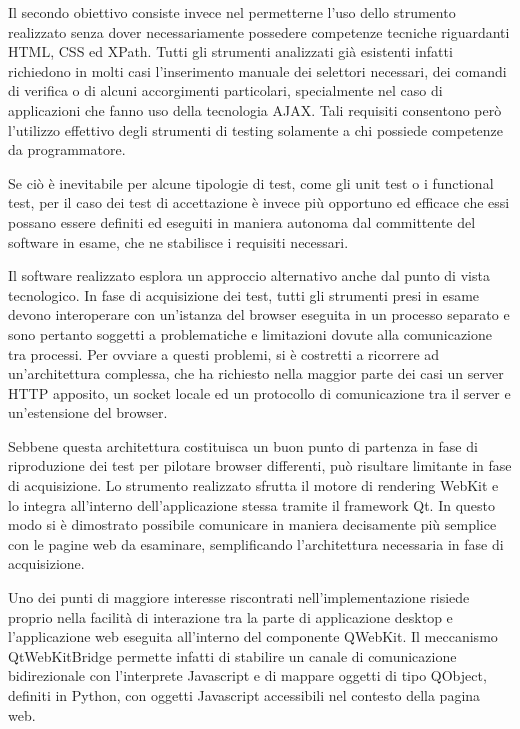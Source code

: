 \documentclass[12pt]{toptesi}
\begin{document}
Il secondo obiettivo consiste invece nel permetterne l'uso dello strumento realizzato senza dover necessariamente possedere competenze tecniche riguardanti HTML, CSS ed XPath. Tutti gli strumenti analizzati già esistenti infatti richiedono in molti casi l'inserimento manuale dei selettori necessari, dei comandi di verifica o di alcuni accorgimenti particolari, specialmente nel caso di applicazioni che fanno uso della tecnologia AJAX. Tali requisiti consentono però l'utilizzo effettivo degli strumenti di testing solamente a chi possiede competenze da programmatore. 

Se ciò è inevitabile per alcune tipologie di test, come gli unit test o i functional test, per il caso dei test di accettazione è invece più opportuno ed efficace che essi possano essere definiti ed eseguiti in maniera autonoma dal committente del software in esame, che ne stabilisce i requisiti necessari.

Il software realizzato esplora un approccio alternativo anche dal punto di vista tecnologico. In fase di acquisizione dei test, tutti gli strumenti presi in esame devono interoperare con un'istanza del browser eseguita in un processo separato e sono pertanto soggetti a problematiche e limitazioni dovute alla comunicazione tra processi. Per ovviare a questi problemi, si è costretti a ricorrere ad un'architettura complessa, che ha richiesto nella maggior parte dei casi un server HTTP apposito, un socket locale ed un protocollo di comunicazione tra il server e un'estensione del browser. 

Sebbene questa architettura costituisca un buon punto di partenza in fase di riproduzione dei test per pilotare browser differenti, può risultare limitante in fase di acquisizione. Lo strumento realizzato sfrutta il motore di rendering WebKit e lo integra all'interno dell'applicazione stessa tramite il framework Qt. In questo modo si è dimostrato possibile comunicare in maniera decisamente più semplice con le pagine web da esaminare, semplificando l'architettura necessaria in fase di acquisizione.

Uno dei punti di maggiore interesse riscontrati nell'implementazione risiede proprio nella facilità di interazione tra la parte di applicazione desktop e l'applicazione web eseguita all'interno del componente QWebKit. Il meccanismo QtWebKitBridge permette infatti di stabilire un canale di comunicazione bidirezionale con l'interprete Javascript e di mappare oggetti di tipo QObject, definiti in Python, con oggetti Javascript accessibili nel contesto della pagina web.
\end{document}
